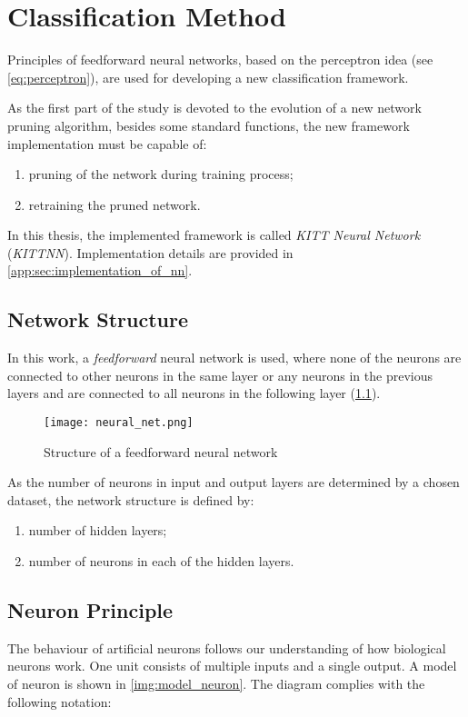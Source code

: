 \chapter{Classification Method} \label{chap:kitt_nn}
Principles of feedforward neural networks, based on the perceptron idea (see \cref{eq:perceptron}), are used for developing a new classification framework.

As the first part of the study is devoted to the evolution of a new network pruning algorithm, besides some standard functions, the new framework implementation must be capable of:

\begin{enumerate}
\item pruning of the network during training process;
\item retraining the pruned network.
\end{enumerate}

In this thesis, the implemented framework is called \textit{KITT Neural Network} (\textit{KITTNN}). Implementation details are provided in \cref{app:sec:implementation_of_nn}.

\section{Network Structure} \label{sec:network_structure}
In this work, a \textit{feedforward} neural network is used, where none of the neurons are connected to other neurons in the same layer or any neurons in the previous layers and are connected to all neurons in the following layer (\cref{img:neural_net}).

\begin{figure}[H]
  \centering
  \texttt{[image: neural\_net.png]}
  \caption{Structure of a feedforward neural network}
  \label{img:neural_net}
\end{figure}

As the number of neurons in input and output layers are determined by a chosen dataset, the network structure is defined by:
\begin{enumerate}
\item number of hidden layers;
\item number of neurons in each of the hidden layers.
\end{enumerate}

\section{Neuron Principle} \label{sec:neuron_principle}
The behaviour of artificial neurons follows our understanding of how biological neurons work. One unit consists of multiple inputs and a single output. A model of neuron is shown in \cref{img:model_neuron}. The diagram complies with the following notation:


